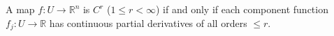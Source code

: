 A map $f: U \to \mathbb{R}^n$ is $C^r$ ($1 \leqslant r < \infty$) if and only if each component function $f_j: U \to \mathbb{R}$ has continuous partial derivatives of all orders $\leqslant r$.
